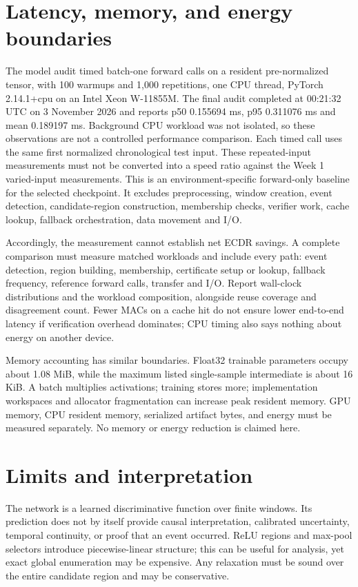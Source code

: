 \documentclass[11pt,a4paper]{article}
\begin{document}
\section{Latency, memory, and energy boundaries}
The model audit timed batch-one forward calls on a resident pre-normalized tensor, with 100 warmups and 1,000 repetitions, one CPU thread, PyTorch 2.14.1+cpu on an Intel Xeon W-11855M. The final audit completed at 00:21:32 UTC on 3 November 2026 and reports p50 0.155694 ms, p95 0.311076 ms and mean 0.189197 ms. Background CPU workload was not isolated, so these observations are not a controlled performance comparison. Each timed call uses the same first normalized chronological test input. These repeated-input measurements must not be converted into a speed ratio against the Week 1 varied-input measurements. This is an environment-specific forward-only baseline for the selected checkpoint. It excludes preprocessing, window creation, event detection, candidate-region construction, membership checks, verifier work, cache lookup, fallback orchestration, data movement and I/O.

Accordingly, the measurement cannot establish net ECDR savings. A complete comparison must measure matched workloads and include every path: event detection, region building, membership, certificate setup or lookup, fallback frequency, reference forward calls, transfer and I/O. Report wall-clock distributions and the workload composition, alongside reuse coverage and disagreement count. Fewer MACs on a cache hit do not ensure lower end-to-end latency if verification overhead dominates; CPU timing also says nothing about energy on another device.

Memory accounting has similar boundaries. Float32 trainable parameters occupy about 1.08 MiB, while the maximum listed single-sample intermediate is about 16 KiB. A batch multiplies activations; training stores more; implementation workspaces and allocator fragmentation can increase peak resident memory. GPU memory, CPU resident memory, serialized artifact bytes, and energy must be measured separately. No memory or energy reduction is claimed here.

\section{Limits and interpretation}
The network is a learned discriminative function over finite windows. Its prediction does not by itself provide causal interpretation, calibrated uncertainty, temporal continuity, or proof that an event occurred. ReLU regions and max-pool selectors introduce piecewise-linear structure; this can be useful for analysis, yet exact global enumeration may be expensive. Any relaxation must be sound over the entire candidate region and may be conservative.
\end{document}
